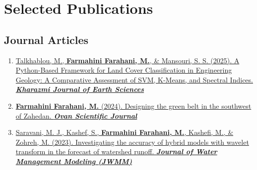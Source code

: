 \documentclass[letterpaper,11pt]{article}
\begin{document}
	\section{Selected Publications}
	\begin{justify}
			\vspace{-0.8em}
		\subsection*{Journal Articles}
		\begin{enumerate}[label=\arabic*.,left=0pt,topsep=7.5pt,partopsep=0pt,itemsep=3.5pt,parsep=0pt]
			\item \href{}{Talkhablou, M., \textbf{Farmahini Farahani, M.}, \& Mansouri, S. S. (2025). A Python-Based Framework for Land Cover Classification in Engineering Geology: A Comparative Assessment of SVM, K-Means, and Spectral Indices. \textit{\textbf{Kharazmi Journal of Earth Sciences}}}
			\item \href{https://www.researchgate.net/publication/381197940_Designing_the_Green_Belt_in_the_southwest_of_Zahedan}{\textbf{Farmahini Farahani, M.} (2024). Designing the green belt in the southwest of Zahedan. \textit{\textbf{Ovan Scientific Journal}}}
			\item \href{https://www.researchgate.net/publication/371328175_Investigating_the_Accuracy_of_Hybrid_Models_with_Wavelet_Transform_in_the_Forecast_of_Watershed_Runoff}{Saravani, M. J., Kashef, S., \textbf{Farmahini Farahani, M.}, Kashefi, M., \& Zohreh, M. (2023). Investigating the accuracy of hybrid models with wavelet transform in the forecast of watershed runoff. \textit{\textbf{Journal of Water Management Modeling (JWMM)}}}
		\end{enumerate}
					\vspace{-0.6em}

\end{justify}
\end{document}
